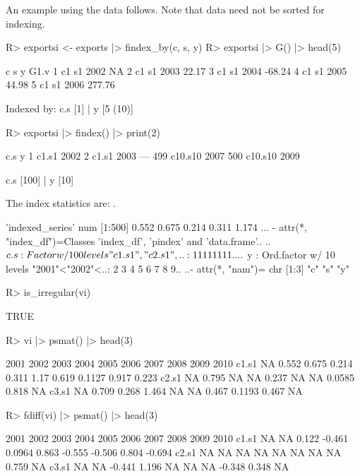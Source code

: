 \documentclass[nojss]{jss} %
\newcommand{\class}[1]{`\code{#1}'}
\begin{document}
An example using the  data follows. Note that data need not be sorted for indexing.
\begin{Schunk}
\begin{Sinput}
R> exportsi <- exports |> findex_by(c, s, y)
R> exportsi |> G() |> head(5)
\end{Sinput}
\begin{Soutput}
   c  s    y   G1.v
1 c1 s1 2002     NA
2 c1 s1 2003  22.17
3 c1 s1 2004 -68.24
4 c1 s1 2005  44.98
5 c1 s1 2006 277.76

Indexed by:  c.s [1] | y [5 (10)] 
\end{Soutput}
\begin{Sinput}
R> exportsi |> findex() |> print(2)
\end{Sinput}
\begin{Soutput}
    c.s    y
1 c1.s1 2002
2 c1.s1 2003
---                
499 c10.s10 2007
500 c10.s10 2009

c.s [100] | y [10]
\end{Soutput}
\end{Schunk}
The index statistics are: . %
\begin{Schunk}
\begin{Soutput}
 'indexed_series' num [1:500] 0.552 0.675 0.214 0.311 1.174 ...
 - attr(*, "index_df")=Classes 'index_df', 'pindex' and 'data.frame'..
  ..$ c.s: Factor w/ 100 levels "c1.s1","c2.s1",..: 1 1 1 1 1 1 1 1 ..
  ..$ y  : Ord.factor w/ 10 levels "2001"<"2002"<..: 2 3 4 5 6 7 8 9..
  ..- attr(*, "nam")= chr [1:3] "c" "s" "y"
\end{Soutput}
\begin{Sinput}
R> is_irregular(vi)
\end{Sinput}
\begin{Soutput}
[1] TRUE
\end{Soutput}
\begin{Sinput}
R> vi |> psmat() |> head(3)
\end{Sinput}
\begin{Soutput}
      2001  2002  2003  2004  2005 2006  2007   2008  2009  2010
c1.s1   NA 0.552 0.675 0.214 0.311 1.17 0.619 0.1127 0.917 0.223
c2.s1   NA 0.795    NA    NA 0.237   NA    NA 0.0585 0.818    NA
c3.s1   NA 0.709 0.268 1.464    NA   NA 0.467 0.1193 0.467    NA
\end{Soutput}
\begin{Sinput}
R> fdiff(vi) |> psmat() |> head(3)
\end{Sinput}
\begin{Soutput}
      2001 2002   2003   2004   2005  2006   2007   2008  2009   2010
c1.s1   NA   NA  0.122 -0.461 0.0964 0.863 -0.555 -0.506 0.804 -0.694
c2.s1   NA   NA     NA     NA     NA    NA     NA     NA 0.759     NA
c3.s1   NA   NA -0.441  1.196     NA    NA     NA -0.348 0.348     NA
\end{Soutput}
\end{Schunk}
\end{document}
